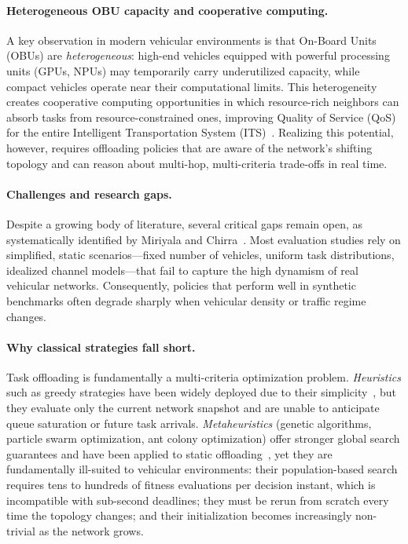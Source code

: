 \documentclass[iicol]{sn-jnl}
\begin{document}
\paragraph{Heterogeneous OBU capacity and cooperative computing.}
A key observation in modern vehicular environments is that On-Board Units
(OBUs) are \emph{heterogeneous}: high-end vehicles equipped with powerful
processing units (GPUs, NPUs) may temporarily carry underutilized capacity,
while compact vehicles operate near their computational limits.
This heterogeneity creates cooperative computing opportunities in which
resource-rich neighbors can absorb tasks from resource-constrained
ones, improving Quality of Service (QoS) for the entire
Intelligent Transportation System (ITS)~\cite{he2019d2d_mec_twc}.
Realizing this potential, however, requires offloading policies that are aware
of the network's shifting topology and can reason about multi-hop, multi-criteria
trade-offs in real time.

\paragraph{Challenges and research gaps.}
Despite a growing body of literature, several critical gaps remain open, as
systematically identified by Miriyala and
Chirra~\cite{miriyala2026dl_offload_review}.
Most evaluation studies rely on simplified, static scenarios—fixed number of
vehicles, uniform task distributions, idealized channel models—that fail to
capture the high dynamism of real vehicular networks.
Consequently, policies that perform well in synthetic benchmarks often degrade
sharply when vehicular density or traffic regime changes.

\paragraph{Why classical strategies fall short.}
Task offloading is fundamentally a multi-criteria optimization problem.
\emph{Heuristics} such as greedy strategies have been widely deployed due to
their simplicity~\cite{ahmed2022survey}, but they evaluate only the current
network snapshot and are unable to anticipate queue saturation or
future task arrivals.
\emph{Metaheuristics} (genetic algorithms, particle swarm optimization, ant
colony optimization) offer stronger global search guarantees and have been
applied to static offloading~\cite{li2020genetic,you2021efficient,kishor2022task},
yet they are fundamentally ill-suited to vehicular environments: their
population-based search requires tens to hundreds of fitness evaluations per
decision instant, which is incompatible with sub-second deadlines; they must
be rerun from scratch every time the topology changes; and their initialization
becomes increasingly non-trivial as the network grows.
\end{document}

